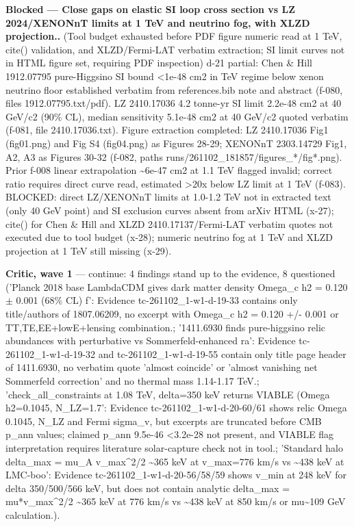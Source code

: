 \documentclass[11pt,a4paper]{article}
\begin{document}
\textbf{Blocked --- Close gaps on elastic SI loop cross section vs LZ 2024/XENONnT limits at 1 TeV and neutrino fog, with XLZD projection..} (Tool budget exhausted before PDF figure numeric read at 1 TeV, cite() validation, and XLZD/Fermi-LAT verbatim extraction; SI limit curves not in HTML figure set, requiring PDF inspection) d-21 partial: Chen \& Hill 1912.07795 pure-Higgsino SI bound \textless{}1e-48 cm2 in TeV regime below xenon neutrino floor established verbatim from references.bib note and abstract (f-080, files 1912.07795.txt/pdf). LZ 2410.17036 4.2 tonne-yr SI limit 2.2e-48 cm2 at 40 GeV/c2 (90\% CL), median sensitivity 5.1e-48 cm2 at 40 GeV/c2 quoted verbatim (f-081, file 2410.17036.txt). Figure extraction completed: LZ 2410.17036 Fig1 (fig01.png) and Fig S4 (fig04.png) as Figures 28-29; XENONnT 2303.14729 Fig1, A2, A3 as Figures 30-32 (f-082, paths runs/261102\_181857/figures\_*/fig*.png). Prior f-008 linear extrapolation \textasciitilde{}6e-47 cm2 at 1.1 TeV flagged invalid; correct ratio requires direct curve read, estimated \textgreater{}20x below LZ limit at 1 TeV (f-083). BLOCKED: direct LZ/XENONnT limits at 1.0-1.2 TeV not in extracted text (only 40 GeV point) and SI exclusion curves absent from arXiv HTML (x-27); cite() for Chen \& Hill and XLZD 2410.17137/Fermi-LAT verbatim quotes not executed due to tool budget (x-28); numeric neutrino fog at 1 TeV and XLZD projection at 1 TeV still missing (x-29).

\textbf{Critic, wave 1} --- continue: 4 findings stand up to the evidence, 8 questioned ('Planck 2018 base LambdaCDM gives dark matter density Omega\_c h2 = 0.120 $\pm$ 0.001 (68\% CL) f': Evidence tc-261102\_1-w1-d-19-33 contains only title/authors of 1807.06209, no excerpt with Omega\_c h2 = 0.120 +/- 0.001 or TT,TE,EE+lowE+lensing combination.; '1411.6930 finds pure-higgsino relic abundances with perturbative vs Sommerfeld-enhanced ra': Evidence tc-261102\_1-w1-d-19-32 and tc-261102\_1-w1-d-19-55 contain only title page header of 1411.6930, no verbatim quote 'almost coincide' or 'almost vanishing net Sommerfeld correction' and no thermal mass 1.14-1.17 TeV.; 'check\_all\_constraints at 1.08 TeV, delta=350 keV returns VIABLE (Omega h2=0.1045, N\_LZ=1.7': Evidence tc-261102\_1-w1-d-20-60/61 shows relic Omega 0.1045, N\_LZ and Fermi sigma\_v, but excerpts are truncated before CMB p\_ann values; claimed p\_ann 9.5e-46 \textless{}3.2e-28 not present, and VIABLE flag interpretation requires literature solar-capture check not in tool.; 'Standard halo delta\_max = mu\_A v\_max\textasciicircum{}2/2 \textasciitilde{}365 keV at v\_max=776 km/s vs \textasciitilde{}438 keV at LMC-boo': Evidence tc-261102\_1-w1-d-20-56/58/59 shows v\_min at 248 keV for delta 350/500/566 keV, but does not contain analytic delta\_max = mu*v\_max\textasciicircum{}2/2 \textasciitilde{}365 keV at 776 km/s vs \textasciitilde{}438 keV at 850 km/s or mu\textasciitilde{}109 GeV calculation.).
\end{document}
